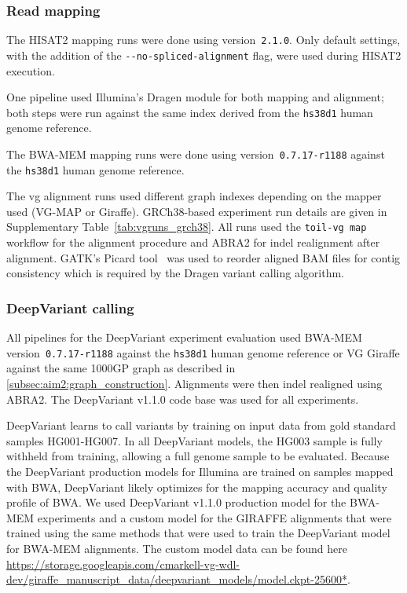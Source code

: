 \documentclass[11pt]{ucscthesis}
\begin{document}
\subsubsection{Read mapping}
The HISAT2 mapping runs were done using version~\texttt{2.1.0}.
Only default settings, with the addition of the \texttt{-{}-no-spliced-alignment} flag, were used during HISAT2 execution.

One pipeline used Illumina's Dragen module for both mapping and alignment; both steps were run against the same index derived from the \texttt{hs38d1} human genome reference.

The BWA-MEM mapping runs were done using version~\texttt{0.7.17-r1188} against the \texttt{hs38d1} human genome reference.

The vg alignment runs used different graph indexes depending on the mapper used (VG-MAP or Giraffe).
GRCh38-based experiment run details are given in Supplementary Table~\ref{tab:vgruns_grch38}.
All runs used the \texttt{toil-vg~map} workflow for the alignment procedure and ABRA2\cite{mose2019improved} for indel realignment after alignment.
GATK's Picard tool~\cite{Picard2019toolkit} was used to reorder aligned BAM files for contig consistency which is required by the Dragen variant calling algorithm.

\subsubsection{DeepVariant calling}
\label{subsec:aim2:deepvariant_calling}

All pipelines for the DeepVariant experiment evaluation used BWA-MEM version~\texttt{0.7.17-r1188} against the \texttt{hs38d1} human genome reference or VG Giraffe against the same 1000GP graph as described in \ref{subsec:aim2:graph_construction}.
Alignments were then indel realigned using ABRA2\cite{mose2019improved}.
The DeepVariant v1.1.0 code base was used for all experiments.

DeepVariant learns to call variants by training on input data from gold standard samples HG001-HG007.
In all DeepVariant models, the HG003 sample is fully withheld from training, allowing a full genome sample to be evaluated.
Because the DeepVariant production models for Illumina are trained on samples mapped with BWA, DeepVariant likely optimizes for the mapping accuracy and quality profile of BWA.
We used DeepVariant v1.1.0 production model for the BWA-MEM experiments and a custom model for the GIRAFFE alignments that were trained using the same methods that were used to train the DeepVariant model for BWA-MEM alignments.
The custom model data can be found here \url{https://storage.googleapis.com/cmarkell-vg-wdl-dev/giraffe_manuscript_data/deepvariant_models/model.ckpt-25600*}.
\end{document}
